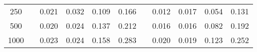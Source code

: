 % 
\begin{tabular}{ccccccccccc}
  \hline
  \hline
250 &  & 0.021 & 0.032 & 0.109 & 0.166 &  & 0.012 & 0.017 & 0.054 & 0.131 \\ 
  500 &  & 0.020 & 0.024 & 0.137 & 0.212 &  & 0.016 & 0.016 & 0.082 & 0.192 \\ 
  1000 &  & 0.023 & 0.024 & 0.158 & 0.283 &  & 0.020 & 0.019 & 0.123 & 0.252 \\ 
   \hline
\end{tabular}
